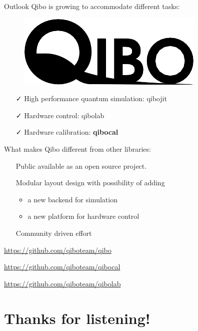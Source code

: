\documentclass[11p,aspectratio=169]{beamer}
\begin{document}
\begin{frame}{Outlook}
    Qibo is growing to accommodate different tasks:
    \begin{figure}
        \includegraphics[width=0.9\linewidth]{figures/qibo_logo.png} 
        \end{figure}
    \begin{itemize}
        \item[ \color{teal} \faCheck] High performance quantum simulation: {\color{blue} qibojit}
        \item[ \color{teal}\faCheck] Hardware control: {\color{red} qibolab}
        \item[ \color{teal} \faCheck] Hardware calibration: { \color{teal} \textbf{qibocal} }
    \end{itemize}

    What makes Qibo different from other libraries:
    \begin{itemize}
        \item[ \faPlus] Public available as an open source project.
        \item[ \faPlus] Modular layout design with possibility of adding
        \begin{itemize}
            \item a new backend for simulation
            \item a new platform for hardware control
        \end{itemize}
        \item[ \faPlus] Community driven effort
    \end{itemize}

    \url{https://github.com/qiboteam/qibo}

    \url{https://github.com/qiboteam/qibocal}
    
    \url{https://github.com/qiboteam/qibolab}
\end{frame}


\section{Thanks for listening!}
\end{document}
